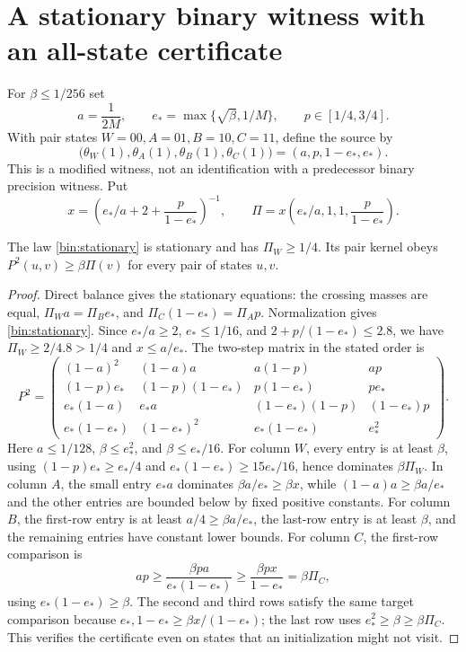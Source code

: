 \section{A stationary binary witness with an all-state certificate}
\label{bin:witness}
For $\beta\le1/256$ set
\[
 a=\frac1{2M},\qquad e_*=\max\{\sqrt\beta,1/M\},\qquad
 p\in[1/4,3/4].
\]
With pair states $W=00,A=01,B=10,C=11$, define the source by
\begin{equation}
 \bigl(\theta_W(1),\theta_A(1),\theta_B(1),\theta_C(1)\bigr)
       =(a,p,1-e_*,e_*).
 \label{bin:source}
\end{equation}
This is a modified witness, not an identification with a predecessor binary precision witness. Put
\begin{equation}
 x=\left(e_*/a+2+\frac p{1-e_*}\right)^{-1},\qquad
 \Pi=x\left(e_*/a,1,1,\frac p{1-e_*}\right).
 \label{bin:stationary}
\end{equation}

\begin{lemma}
\label{bin:certificate}
The law \eqref{bin:stationary} is stationary and has $\Pi_W\ge1/4$. Its pair kernel obeys $P^2(u,v)\ge\beta\Pi(v)$ for every pair of states $u,v$.
\end{lemma}
\begin{proof}
Direct balance gives the stationary equations: the crossing masses are equal, $\Pi_W a=\Pi_B e_*$, and $\Pi_C(1-e_*)=\Pi_Ap$. Normalization gives \eqref{bin:stationary}. Since $e_*/a\ge2$, $e_*\le1/16$, and $2+p/(1-e_*)\le2.8$, we have $\Pi_W\ge2/4.8>1/4$ and $x\le a/e_*$. The two-step matrix in the stated order is
\[
 P^2=\begin{pmatrix}
 (1-a)^2&(1-a)a&a(1-p)&ap\\
 (1-p)e_*&(1-p)(1-e_*)&p(1-e_*)&pe_*\\
 e_*(1-a)&e_*a&(1-e_*)(1-p)&(1-e_*)p\\
 e_*(1-e_*)&(1-e_*)^2&e_*(1-e_*)&e_*^2
 \end{pmatrix}.
\]
Here $a\le1/128$, $\beta\le e_*^2$, and $\beta\le e_*/16$. For column $W$, every entry is at least $\beta$, using $(1-p)e_*\ge e_*/4$ and $e_*(1-e_*)\ge15e_*/16$, hence dominates $\beta\Pi_W$. In column $A$, the small entry $e_*a$ dominates $\beta a/e_*\ge\beta x$, while $(1-a)a\ge\beta a/e_*$ and the other entries are bounded below by fixed positive constants. For column $B$, the first-row entry is at least $a/4\ge\beta a/e_*$, the last-row entry is at least $\beta$, and the remaining entries have constant lower bounds. For column $C$, the first-row comparison is
\[
 ap\ge\frac{\beta pa}{e_*(1-e_*)}\ge\frac{\beta px}{1-e_*}=\beta\Pi_C,
\]
using $e_*(1-e_*)\ge\beta$. The second and third rows satisfy the same target comparison because $e_*,1-e_*\ge\beta x/(1-e_*)$; the last row uses $e_*^2\ge\beta\ge\beta\Pi_C$. This verifies the certificate even on states that an initialization might not visit.
\end{proof}

